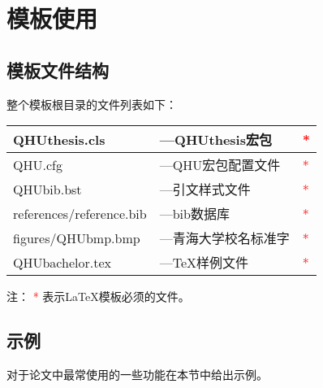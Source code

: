 \chapter{模板使用}
\section{模板文件结构\label{sec:files}}
整个模板根目录的文件列表如下：
\begin{center}
\begin{tabular}{|l|l|l|}
\hline
QHUthesis.cls & ---QHUthesis宏包 & \textcolor{red}{{*}}\\
\hline
QHU.cfg & ---QHU宏包配置文件 & \textcolor{red}{{*}}\\
\hline
QHUbib.bst & ---引文样式文件 & \textcolor{red}{{*}}\\
\hline
references/reference.bib & ---bib数据库 & \textcolor{red}{{*}}\\
\hline
figures/QHUbmp.bmp & ---青海大学校名标准字 & \textcolor{red}{{*}}\\
\hline
QHUbachelor.tex & ---\TeX{}样例文件 &\textcolor{red}{{*}}\\
\hline
\end{tabular}
\end{center}
注： \textcolor{red}{{*}} 表示\LaTeX{}模板必须的文件。
\section{示例}
对于论文中最常使用的一些功能在本节中给出示例。
